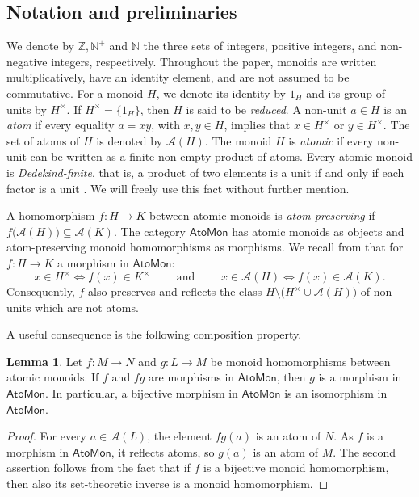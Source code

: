 \documentclass[a4paper,10pt,reqno]{amsart}
\theoremstyle{definition}
\newtheorem{lemma}[theorem]{Lemma}
\theoremstyle{remark}
\newcommand{\AtoMon}{\mathsf{AtoMon}}
\newcommand{\A}{\mathscr A}
\begin{document}
\subsection{Notation and preliminaries}\label{subsec:atomic-preliminaries} 
We denote by $\mathbb Z, \mathbb N^+$ and $\mathbb N$ the three sets of integers, positive integers, and non-negative integers, respectively. Throughout the paper, monoids are written multiplicatively, have an identity element, and are not assumed to be commutative. For a monoid $H$, we denote its identity by $1_H$ and its group of units by $H^\times$. If $H^\times=\{1_H\}$, then $H$ is said to be {\em reduced}. A non-unit $a\in H$ is an \emph{atom} if every equality $a=xy$, with $x,y\in H$, implies that $x\in H^\times$ or $y\in H^\times$. The set of atoms of $H$ is denoted by $\A(H)$.
The monoid $H$ is \emph{atomic} if every non-unit can be written as a finite non-empty product of atoms. Every atomic monoid is {\em Dedekind-finite}, that is, a product of two elements is a unit if and only if each factor is a unit \cite[Proposition 2.30]{FT}. We will freely use this fact without further mention.

A homomorphism $f\colon H\to K$ between atomic monoids is \emph{atom-preserving} if
$f\bigl(\A(H)\bigr)\subseteq\A(K)$.
The category $\AtoMon$ has atomic monoids as objects and atom-preserving monoid homomorphisms as morphisms. We recall from \cite[Remark 3.1(ii)]{CCT} that for
$f\colon H\to K$ a morphism in $\AtoMon$:
$$
    x\in H^\times
    \Longleftrightarrow
    f(x)\in K^\times
 \qquad \text{ and }\qquad
    x\in\A(H)
    \Longleftrightarrow
    f(x)\in\A(K).
$$
Consequently, $f$ also preserves and reflects the class $H\setminus\bigl(H^\times\cup\A(H)\bigr)$
of non-units which are not atoms.

A useful consequence is the following composition property.

\begin{lemma}\label{lem:cancel-atom-preservation}
Let $f\colon M \to N$ and $g\colon L \to M$ be monoid homomorphisms between atomic monoids. If $f$ and $fg$ are morphisms in $\AtoMon$, then $g$ is a morphism in $\AtoMon$. In particular, a bijective morphism in $\AtoMon$ is an isomorphism in $\AtoMon$.
\end{lemma}

\begin{proof}
For every $a\in\A(L)$, the element $fg(a)$ is an atom of $N$. As $f$ is a morphism in $\AtoMon$, it reflects atoms, so $g(a)$ is an atom of $M$. The second assertion follows from the fact that if $f$ is a bijective monoid homomorphism, then also its set-theoretic inverse is a monoid homomorphism.
\end{proof}
\end{document}
